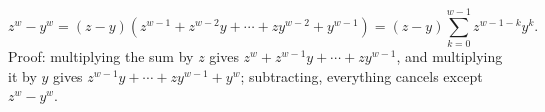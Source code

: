 \[
\boxed{z^w-y^w=(z-y)\left(z^{w-1}+z^{w-2}y+\cdots+zy^{w-2}+y^{w-1}\right)=(z-y)\sum_{k=0}^{w-1}z^{w-1-k}y^k}.
\]
Proof: multiplying the sum by $z$ gives $z^w+z^{w-1}y+\cdots+zy^{w-1}$, and multiplying it by $y$ gives $z^{w-1}y+\cdots+zy^{w-1}+y^w$; subtracting, everything cancels except $z^w-y^w$.
